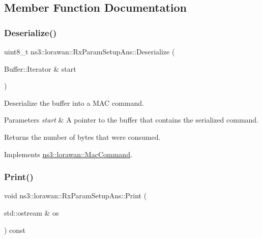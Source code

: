 \subsection{Member Function Documentation}
\mbox{\label{classns3_1_1lorawan_1_1RxParamSetupAns_a947a969469c7f9df3819b6359193258e}} 
\subsubsection{\texorpdfstring{Deserialize()}{Deserialize()}}
{\footnotesize\ttfamily uint8\+\_\+t ns3\+::lorawan\+::\+Rx\+Param\+Setup\+Ans\+::\+Deserialize (\begin{DoxyParamCaption}\item[{Buffer\+::\+Iterator \&}]{start }\end{DoxyParamCaption})\hspace{0.3cm}{\ttfamily [virtual]}}

Deserialize the buffer into a M\+AC command.


\begin{DoxyParams}{Parameters}
{\em start} & A pointer to the buffer that contains the serialized command. \\
\hline
\end{DoxyParams}
\begin{DoxyReturn}{Returns}
the number of bytes that were consumed. 
\end{DoxyReturn}


Implements \hyperlink{classns3_1_1lorawan_1_1MacCommand_af12d223a71a67196bce498f1240eda75}{ns3\+::lorawan\+::\+Mac\+Command}.

\mbox{\label{classns3_1_1lorawan_1_1RxParamSetupAns_a1972e0a8577118a86e15545e93d4460e}} 
\subsubsection{\texorpdfstring{Print()}{Print()}}
{\footnotesize\ttfamily void ns3\+::lorawan\+::\+Rx\+Param\+Setup\+Ans\+::\+Print (\begin{DoxyParamCaption}\item[{std\+::ostream \&}]{os }\end{DoxyParamCaption}) const\hspace{0.3cm}{\ttfamily [virtual]}}

